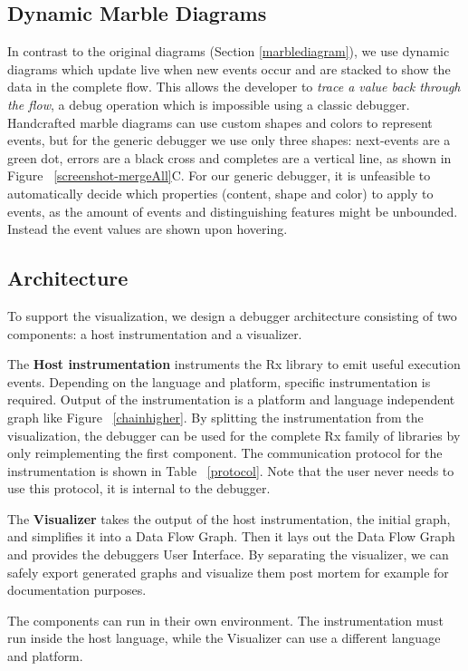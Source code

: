 \subsection{Dynamic Marble Diagrams} In contrast to the original
diagrams (Section%
\ref{marblediagram}), we use dynamic diagrams which update live when new
events occur and are stacked to show the data in the complete flow.
This allows the developer to \emph{trace a value back through the flow},
a debug operation which is impossible using a classic debugger.
Handcrafted marble diagrams can use custom shapes and colors to
represent events, but for the generic debugger we use only three shapes:
next-events are a green dot, errors are a black cross and completes are
a vertical line, as shown in Figure~%
\ref{screenshot-mergeAll}C.  For our generic debugger, it is unfeasible
to automatically decide which properties (content, shape and color) to
apply to events, as the amount of events and distinguishing features
might be unbounded.  Instead the event values are shown upon hovering.

\subsection{Architecture} To support the visualization, we design a
debugger architecture consisting of two components:  a host
instrumentation and a visualizer.

The \textbf{Host instrumentation} instruments the Rx library to emit
useful execution events.  Depending on the language and platform,
specific instrumentation is required.  Output of the instrumentation is
a platform and language independent graph like Figure~%
\ref{chainhigher}.  By splitting the instrumentation from the
visualization, the debugger can be used for the complete Rx family of
libraries by only reimplementing the first component.  The communication
protocol for the instrumentation is shown in Table~%
\ref{protocol}. Note that the user never needs to use 
this protocol, it is internal to the debugger.

The \textbf{Visualizer} takes the output of the host instrumentation,
the initial graph, and simplifies it into a Data Flow Graph.  Then it
lays out the Data Flow Graph and provides the debuggers User Interface.
By separating the visualizer, we can safely export generated graphs and
visualize them post mortem for example for documentation purposes.

The components can run in their own environment.  The instrumentation
must run inside the host language, while the Visualizer can use a
different language and platform.

